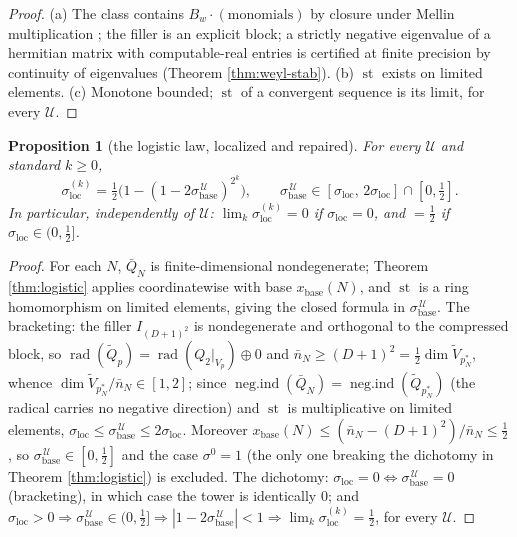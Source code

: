 \documentclass[11pt,reqno]{amsart}
\newtheorem{proposition}[theorem]{Proposition}
\theoremstyle{definition}
\newcommand{\negind}{\operatorname{neg.ind}}
\newcommand{\sst}{\operatorname{st}}
\newcommand{\half}{\tfrac12}
\begin{document}
\begin{proof}
(a) The class contains \(B_w\cdot(\text{monomials})\) by closure under Mellin
multiplication \cite{P40}; the filler is an explicit block; a strictly negative
eigenvalue of a hermitian matrix with computable-real entries is certified at
finite precision by continuity of eigenvalues (Theorem \ref{thm:weyl-stab}).
(b) \(\sst\) exists on limited elements. (c) Monotone
bounded; \(\sst\) of a convergent sequence is its limit, for every
\(\mathcal U\).
\end{proof}

\begin{proposition}[the logistic law, localized and repaired]
\label{prop:loc-logistic}
For every \(\mathcal U\) and standard \(k\geq0\),
\[
\sigma_{\mathrm{loc}}^{(k)}
=\half\bigl(1-(1-2\sigma_{\mathrm{base}}^{\,\mathcal U})^{2^k}\bigr),
\qquad
\sigma_{\mathrm{base}}^{\,\mathcal U}\in
[\sigma_{\mathrm{loc}},\,2\sigma_{\mathrm{loc}}]\cap[0,\tfrac12].
\]
In particular, \emph{independently of \(\mathcal U\)}:
\(\lim_k\sigma_{\mathrm{loc}}^{(k)}=0\) if \(\sigma_{\mathrm{loc}}=0\), and
\(=\half\) if \(\sigma_{\mathrm{loc}}\in(0,\tfrac12]\).
\end{proposition}

\begin{proof}
For each \(N\), \(\bar Q_N\) is finite-dimensional nondegenerate; Theorem
\ref{thm:logistic} applies coordinatewise with base \(x_{\mathrm{base}}(N)\),
and \(\sst\) is a ring homomorphism on limited elements, giving the closed
formula in \(\sigma_{\mathrm{base}}^{\,\mathcal U}\). The bracketing: the filler
\(I_{(D+1)^2}\) is nondegenerate and orthogonal to the compressed block, so
\(\operatorname{rad}(\tilde Q_p)=\operatorname{rad}(Q_2|_{V_p})\oplus0\) and
\(\bar n_N\geq(D+1)^2=\tfrac12\dim\tilde V_{p^*_N}\), whence
\(\dim\tilde V_{p^*_N}/\bar n_N\in[1,2]\); since
\(\negind(\bar Q_N)=\negind(\tilde Q_{p^*_N})\) (the radical carries no negative
direction) and \(\sst\) is multiplicative on limited elements,
\(\sigma_{\mathrm{loc}}\leq\sigma_{\mathrm{base}}^{\,\mathcal U}
\leq2\sigma_{\mathrm{loc}}\). Moreover
\(x_{\mathrm{base}}(N)\leq(\bar n_N-(D+1)^2)/\bar n_N\leq\half\), so
\(\sigma_{\mathrm{base}}^{\,\mathcal U}\in[0,\half]\) and the case
\(\sigma^0=1\) (the only one breaking the dichotomy in Theorem
\ref{thm:logistic}) is excluded. The dichotomy: \(\sigma_{\mathrm{loc}}=0\iff
\sigma_{\mathrm{base}}^{\,\mathcal U}=0\) (bracketing), in which case the tower
is identically \(0\); and \(\sigma_{\mathrm{loc}}>0\Rightarrow
\sigma_{\mathrm{base}}^{\,\mathcal U}\in(0,\half]\Rightarrow
|1-2\sigma_{\mathrm{base}}^{\,\mathcal U}|<1\Rightarrow
\lim_k\sigma_{\mathrm{loc}}^{(k)}=\half\), for every \(\mathcal U\).
\end{proof}
\end{document}
